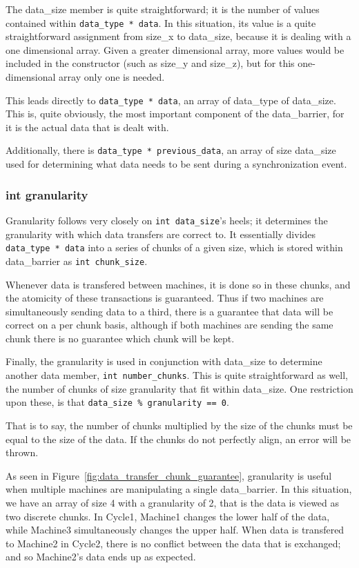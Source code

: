 \documentclass[../thesis.tex]{subfiles}
\begin{document}
      The data\_size member is quite straightforward; it is the number of values contained within \texttt{data\_type * data}. In this situation, its value is a quite straightforward assignment from size\_x to data\_size, because it is dealing with a one dimensional array. Given a greater dimensional array, more values would be included in the constructor (such as size\_y and size\_z), but for this one-dimensional array only one is needed.

      This leads directly to \texttt{data\_type * data}, an array of data\_type of data\_size. This is, quite obviously, the most important component of the data\_barrier, for it is the actual data that is dealt with.

      Additionally, there is \texttt{data\_type * previous\_data}, an array of size data\_size used for determining what data needs to be sent during a synchronization event.

  \subsubsection{int granularity} %
  \label{ssub:int_granularity}
    Granularity follows very closely on \texttt{int data\_size}'s heels; it determines the granularity with which data transfers are correct to. It essentially divides \texttt{data\_type * data} into a series of chunks of a given size, which is stored within data\_barrier as \texttt{int chunk\_size}.

    Whenever data is transfered between machines, it is done so in these chunks, and the atomicity of these transactions is guaranteed. Thus if two machines are simultaneously sending data to a third, there is a guarantee that data will be correct on a per chunk basis, although if both machines are sending the same chunk there is no guarantee which chunk will be kept.

    Finally, the granularity is used in conjunction with data\_size to determine another data member, \texttt{int number\_chunks}. This is quite straightforward as well, the number of chunks of size granularity that fit within data\_size. One restriction upon these, is that \texttt{data\_size \% granularity == 0}.

    That is to say, the number of chunks multiplied by the size of the chunks must be equal to the size of the data. If the chunks do not perfectly align, an error will be thrown.
 
    As seen in Figure~\ref{fig:data_transfer_chunk_guarantee}, granularity is useful when multiple machines are manipulating a single data\_barrier. In this situation, we have an array of size 4 with a granularity of 2, that is the data is viewed as two discrete chunks. In Cycle1, Machine1 changes the lower half of the data, while Machine3 simultaneously changes the upper half. When data is transfered to Machine2 in Cycle2, there is no conflict between the data that is exchanged; and so Machine2's data ends up as expected.
\end{document}
